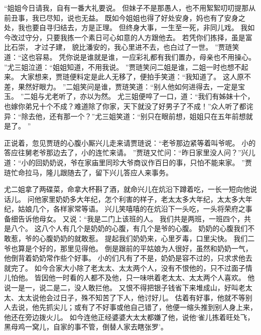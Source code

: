 “姐姐今日请我，自有一番大礼要说。
但妹子不是那愚人，也不用絮絮叨叨提那从前丑事，我已尽知，说也无益。
既如今姐姐也得了好处安身，妈也有了安身之处，我也要自寻归结去，方是正理。
但终身大事，一生至一死，非同儿戏。
我如今改过守分，只要我拣一个素日可心如意的人方跟他去。
若凭你们拣择，虽是富比石崇，
才过子建，
貌比潘安的，我心里进不去，也白过了一世。
”贾琏笑道：“这也容易。
凭你说是谁就是谁，一应彩礼都有我们置办，母亲也不用操心。
”尤三姐泣道：“姐姐知道，不用我说。
”贾琏笑问二姐是谁，二姐一时也想不起来。
大家想来，贾琏便料定是此人无移了，便拍手笑道：“我知道了。
这人原不差，果然好眼力。
”二姐笑问是谁，贾琏笑道：“别人他如何进得去，一定是宝玉。
”二姐与尤老听了，亦以为然。
尤三姐便啐了一口，道：“我们有姊妹十个，也嫁你弟兄十个不成？难道除了你家，天下就没了好男子了不成！”众人听了都诧异：“除去他，还有那一个？”尤三姐笑道：“别只在眼前想，姐姐只在五年前想就是了。
”\par
正说着，忽见贾琏的心腹小厮兴儿走来请贾琏说：“老爷那边紧等着叫爷呢。
小的答应往舅老爷那边去了，小的连忙来请。
”贾琏又忙问：“昨日家里没人问？”兴儿道：“小的回奶奶说，爷在家庙里同珍大爷商议作百日的事，只怕不能来家。
”贾琏忙命拉马，隆儿跟随去了，留下兴儿答应人来事务。
\par
尤二姐拿了两碟菜，命拿大杯斟了酒，就命兴儿在炕沿下蹲着吃，一长一短向他说话儿。
问他家里奶奶多大年纪，怎个利害的样子，老太太多大年纪，太太多大年纪，姑娘几个，各样家常等语。
兴儿笑嘻嘻的在炕沿下一头吃，一头将荣府之事备细告诉他母女。
又说：“我是二门上该班的人。
我们共是两班，一班四个，共是八个。
这八个人有几个是奶奶的心腹，有几个是爷的心腹。
奶奶的心腹我们不敢惹，爷的心腹奶奶的就敢惹。
提起我们奶奶来，心里歹毒，口里尖快。
我们二爷也算是个好的，那里见得他。
倒是跟前的平姑娘为人很好，虽然和奶奶一气，他倒背着奶奶常作些个好事。
小的们凡有了不是，奶奶是容不过的，只求求他去就完了。
如今合家大小除了老太太、太太两个人，没有不恨他的，只不过面子情儿怕他。
皆因他一时看的人都不及他，只一味哄着老太太、太太两个人喜欢。
他说一是一，说二是二，没人敢拦他。
又恨不得把银子钱省下来堆成山，好叫老太太、太太说他会过日子，殊不知苦了下人，他讨好儿。
估着有好事，他就不等别人去说，他先抓尖儿；或有了不好事或他自己错了，他便一缩头推到别人身上来，他还在旁边拨火儿。
如今连他正经婆婆大太太都嫌了他，说他‘雀儿拣着旺处飞，黑母鸡一窝儿，自家的事不管，倒替人家去瞎张罗’。
